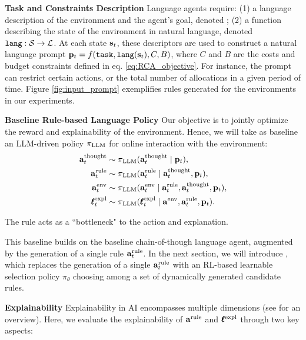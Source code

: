 \textbf{Task and Constraints Description}\quad
Language agents require: (1) a language description of the environment and the agent's goal, denoted \task; (2) a function describing the state of the environment in natural language, denoted $\texttt{lang}:{\mathcal{S}}\to {\mathcal{L}}$.  At each state ${\mathbf{s}}_t$, these descriptors are used to construct a natural language prompt ${\mathbf{p}}_t=f(\texttt{task}, \texttt{lang}({\mathbf{s}}_t), C, B)$, where $C$ and $B$ are the costs and budget constraints defined in eq. \eqref{eq:RCA_objective}. For instance, the prompt can restrict certain actions, or the total number of allocations in a given period of time.
Figure \ref{fig:input_prompt} exemplifies rules generated for the environments in our experiments. 





\textbf{Baseline Rule-based Language Policy}\quad
Our objective is to jointly optimize the reward and explainability of the environment. Hence, we will take as baseline an LLM-driven policy $\pi_{\textrm{LLM}}$ for online interaction with the environment:
\begin{align}\label{eq:lang-policy}
\athought_t & \sim \pi_{\llm}(\athought_t \mid \bp_t), \allowdisplaybreaks\\\label{eq:lang-policy-rule}
\arule_t  & \sim \pi_{\llm}(\arule_t  \mid \athought_t, \bp_t), \\\label{eq:lang-policy-env}
\aenv_t   & \sim \pi_{\llm}(\aenv_t  \mid \arule_t, \athought_t, \bp_t),\allowdisplaybreaks \\ \label{eq:lang-policy-expl}
\aexpl_t  & \sim \pi_{\llm}(\aexpl_t \mid \aenv, \arule_t , \bp_t).
\end{align}



The rule acts as a ``bottleneck" to the action and explanation.

\begin{remark} This baseline builds on the baseline chain-of-though language agent, augmented by the generation of a single rule ${\mathbf{a}}^{\text{rule}}_t$. In the next section, we will introduce \rbrl, which replaces the generation of a single ${\mathbf{a}}^{\text{rule}}_t$ with an RL-based learnable selection policy $\pi_\theta$ choosing among a set of dynamically generated candidate rules.
\end{remark}


\textbf{Explainability}\quad
Explainability in AI encompasses multiple dimensions (see \citet{hoffman2018metrics} for an overview). Here, we evaluate the explainability of 
${\mathbf{a}}^{\text{rule}}$ and $\pmb{\ell}^{\text{expl}}$ through two key aspects:

